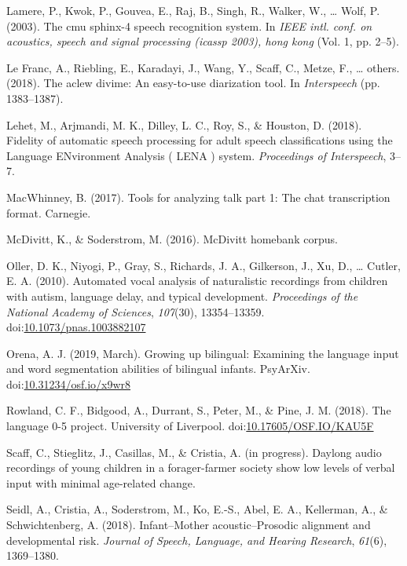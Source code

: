 \documentclass[english,floatsintext,man]{apa6}
\begin{document}
\hypertarget{ref-lamere2003cmu}{}
Lamere, P., Kwok, P., Gouvea, E., Raj, B., Singh, R., Walker, W.,
\ldots{} Wolf, P. (2003). The cmu sphinx-4 speech recognition system. In
\emph{IEEE intl. conf. on acoustics, speech and signal processing
(icassp 2003), hong kong} (Vol. 1, pp. 2--5).

\hypertarget{ref-le2018aclew}{}
Le Franc, A., Riebling, E., Karadayi, J., Wang, Y., Scaff, C., Metze,
F., \ldots{} others. (2018). The aclew divime: An easy-to-use
diarization tool. In \emph{Interspeech} (pp. 1383--1387).

\hypertarget{ref-Lehet2018}{}
Lehet, M., Arjmandi, M. K., Dilley, L. C., Roy, S., \& Houston, D.
(2018). Fidelity of automatic speech processing for adult speech
classifications using the Language ENvironment Analysis ( LENA ) system.
\emph{Proceedings of Interspeech}, 3--7.

\hypertarget{ref-macwhinney2017tools}{}
MacWhinney, B. (2017). Tools for analyzing talk part 1: The chat
transcription format. Carnegie.

\hypertarget{ref-mcdivitt2016mcdivitt}{}
McDivitt, K., \& Soderstrom, M. (2016). McDivitt homebank corpus.

\hypertarget{ref-Oller}{}
Oller, D. K., Niyogi, P., Gray, S., Richards, J. A., Gilkerson, J., Xu,
D., \ldots{} Cutler, E. A. (2010). Automated vocal analysis of
naturalistic recordings from children with autism, language delay, and
typical development. \emph{Proceedings of the National Academy of
Sciences}, \emph{107}(30), 13354--13359.
doi:\href{https://doi.org/10.1073/pnas.1003882107}{10.1073/pnas.1003882107}

\hypertarget{ref-orena_2019}{}
Orena, A. J. (2019, March). Growing up bilingual: Examining the language
input and word segmentation abilities of bilingual infants. PsyArXiv.
doi:\href{https://doi.org/10.31234/osf.io/x9wr8}{10.31234/osf.io/x9wr8}

\hypertarget{ref-rowland2018}{}
Rowland, C. F., Bidgood, A., Durrant, S., Peter, M., \& Pine, J. M.
(2018). The language 0-5 project. University of Liverpool.
doi:\href{https://doi.org/10.17605/OSF.IO/KAU5F}{10.17605/OSF.IO/KAU5F}

\hypertarget{ref-scaff}{}
Scaff, C., Stieglitz, J., Casillas, M., \& Cristia, A. (in progress).
Daylong audio recordings of young children in a forager-farmer society
show low levels of verbal input with minimal age-related change.

\hypertarget{ref-Seidl2018}{}
Seidl, A., Cristia, A., Soderstrom, M., Ko, E.-S., Abel, E. A.,
Kellerman, A., \& Schwichtenberg, A. (2018). Infant--Mother
acoustic--Prosodic alignment and developmental risk. \emph{Journal of
Speech, Language, and Hearing Research}, \emph{61}(6), 1369--1380.
\end{document}
